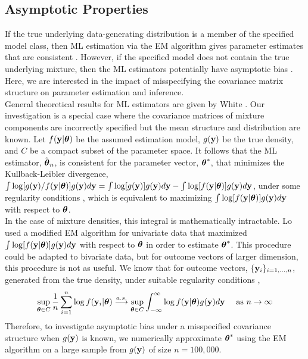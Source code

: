 \subsection{Asymptotic Properties}
If the true underlying data-generating distribution is a member of the specified model class, then ML estimation via the EM algorithm gives parameter estimates that are consistent  \cite{wald1949, lecam1953}. However, if the specified model does not contain the true underlying mixture, then the ML estimators potentially have asymptotic bias \cite{gray1994,lo2011}. Here, we are interested in the impact of misspecifying the covariance matrix structure on parameter estimation and inference.\\

General theoretical results for ML estimators are given by White \cite{white1982}. Our investigation is a special case where the covariance matrices of mixture components are incorrectly specified but the mean structure and distribution are known. Let $f(\mathbf y|\boldsymbol \theta)$ be the assumed estimation model, $g(\mathbf y)$ be the true density, and $C$ be a compact subset of the parameter space. It follows that the ML estimator, $\hat{\boldsymbol\theta}_{n}$, is consistent for the parameter vector, $\boldsymbol\theta^{*}$, that minimizes the Kullback-Leibler divergence, $\int \log[g(\mathbf y)/f(\mathbf y|\boldsymbol\theta)]g(\mathbf y)d\mathbf y=\int \log[g(\mathbf y)]g(\mathbf y)d\mathbf y-\int \log[f(\mathbf y|\boldsymbol\theta)]g(\mathbf y)d\mathbf y$, under some regularity conditions \cite{white1982}, which is equivalent to maximizing $\int \log[f(\mathbf y|\boldsymbol\theta)]g(\mathbf y)d\mathbf y$ with respect to $\boldsymbol\theta$.  \\

In the case of mixture densities, this integral is mathematically intractable. Lo \cite{lo2011} used a modified EM algorithm for univariate data that maximized $\int \log[f(\mathbf y|\boldsymbol\theta)]g(\mathbf y)d\mathbf y$  with respect to $\boldsymbol \theta$ in order to estimate $\boldsymbol\theta^{*}$. This procedure could be adapted to bivariate data, but for outcome vectors of larger dimension, this procedure is not as useful.  We know that for outcome vectors, $\{\mathbf y_i\}_{i=1,...,n}$, generated from the true density, under suitable regularity conditions \cite{jennrich1969},
$$\sup_{\boldsymbol \theta\in C}\frac{1}{n}\sum_{i=1}^{n} \log f(\mathbf y_{i}|\boldsymbol \theta)\overset{a.s.}{\longrightarrow} \sup_{\boldsymbol \theta\in C} \int^{\infty}_{-\infty} \log f(\mathbf y|\boldsymbol \theta)g(\mathbf y)d\mathbf y \quad \text{ as } n\rightarrow \infty$$
Therefore, to investigate asymptotic bias under a misspecified covariance structure when $g(\mathbf y)$ is known, we numerically approximate $\boldsymbol\theta^{*}$ using the EM algorithm on a large sample from $g(\mathbf y)$ of size $n=100,000$. \\

